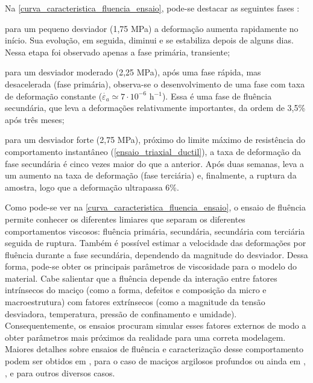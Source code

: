 Na \autoref{curva_caracteristica_fluencia_ensaio}, pode-se destacar as seguintes fases \cite[p. 42]{Rousset1988}:

\begin{alineas}
	
	\item para um pequeno desviador (1,75 MPa) a deformação aumenta rapidamente no início. Sua evolução, em seguida, diminui e se estabiliza depois de alguns dias. Nessa etapa foi observado apenas a fase primária, transiente;
	
	\item para um desviador moderado (2,25 MPa), após uma fase rápida, mas desacelerada (fase primária), observa-se o desenvolvimento de uma fase com taxa de deformação constante ($\dot{\varepsilon_a}\simeq 7\cdot {{10}^{-6}}$ h$^{-1}$). Essa é uma fase de fluência secundária, que leva a deformações relativamente importantes, da ordem de 3,5\% após três meses;
	
	\item para um desviador forte (2,75 MPa), próximo do limite máximo de resistência do comportamento instantâneo (\autoref{ensaio_triaxial_ductil}), a taxa de deformação da fase secundária é cinco vezes maior do que a anterior. Após duas semanas, leva a um aumento na taxa de deformação (fase terciária) e, finalmente, a ruptura da amostra, logo que a deformação ultrapassa 6\%.
	
\end{alineas}

Como pode-se ver na \autoref{curva_caracteristica_fluencia_ensaio}, o ensaio de fluência permite conhecer os diferentes limiares que separam os diferentes comportamentos viscosos: fluência primária, secundária, secundária com terciária seguida de ruptura. Também é possível estimar a velocidade das deformações por fluência durante a fase secundária, dependendo da magnitude do desviador. Dessa forma, pode-se obter os principais parâmetros de viscosidade para o modelo do material. Cabe salientar que a fluência depende da interação entre fatores intrínsecos do maciço (como a forma, defeitos e composição da micro e macroestrutura) com fatores extrínsecos (como a magnitude da tensão desviadora, temperatura, pressão de confinamento e umidade). Consequentemente, os ensaios procuram simular esses fatores externos de modo a obter parâmetros mais próximos da realidade para uma correta modelagem. Maiores detalhes sobre ensaios de fluência e caracterização desse comportamento podem ser obtidos em , para o caso de maciços argilosos profundos ou ainda em , ,  e  para outros diversos casos.

